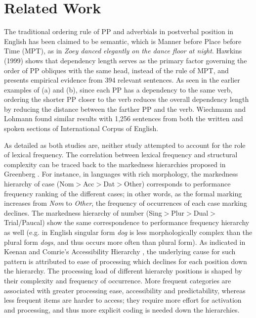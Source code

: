 \documentclass[11pt,letterpaper]{article}
\begin{document}
\section{Related Work}

The traditional ordering rule of PP and adverbials in postverbal position in English has been claimed to be semantic, which is Manner before Place before Time (MPT), as in \textit{Zoey danced elegantly on the dance floor at night}. Hawkins (1999) shows that dependency length serves as the primary factor governing the order of PP obliques with the same head, instead of the rule of MPT, and presents empirical evidence from 394 relevant sentences. As seen in the earlier examples of (a) and (b), since each PP has a dependency to the same verb, ordering the shorter PP closer to the verb reduces the overall dependency length by reducing the distance between the farther PP and the verb. Wiechmann and Lohmann  found similar results with 1,256 sentences from both the written and spoken sections of International Corpus of English.

As detailed as both studies are, neither study attempted to account for the role of lexical frequency. The correlation between lexical frequency and structural complexity can be traced back to the markedness hierarchies proposed in Greenberg . For instance, in languages with rich morphology, the markedness hierarchy of case (Nom$>$Acc$>$Dat$>$Other) corresponds to performance frequency ranking of the different cases; in other words, as the formal marking increases from \textit{Nom} to \textit{Other}, the frequency of occurrences of each case marking declines. The markedness hierarchy of number (Sing$>$Plur$>$Dual$>$Trial/Paucal) show the same correspondence to performance frequency hierarchy as well (e.g. in English singular form \textit{dog} is less morphologically complex than the plural form \textit{dogs}, and thus occurs more often than plural form). As indicated in Keenan and Comrie’s Accessibility Hierarchy , the underlying cause for such pattern is attributed to ease of processing which declines for each position down the hierarchy. The processing load of different hierarchy positions is shaped by their complexity and frequency of occurrence. More frequent categories are associated with greater processing ease, accessibility and predictability, whereas less frequent items are harder to access; they require more effort for activation and processing, and thus more explicit coding is needed down the hierarchies. 
\end{document}
